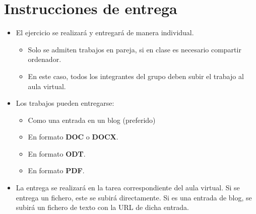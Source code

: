 \section{Instrucciones de entrega}
\begin{itemize}
\item El ejercicio se realizará y entregará de manera individual.
  \begin{itemize}
  \item Solo se admiten trabajos en pareja, si en clase es necesario compartir ordenador.
  \item En este caso, todos los integrantes del grupo deben subir el trabajo al aula virtual.

  \end{itemize}
\item Los trabajos pueden entregarse:
  \begin{itemize}
  \item Como una entrada en un blog (preferido)  
  \item En formato \textbf{DOC} o \textbf{DOCX}.
  \item En formato \textbf{ODT}.
  \item En formato \textbf{PDF}. 

  \end{itemize}

  
\item La entrega se realizará en la tarea correspondiente del aula virtual. Si se entrega un fichero, este se subirá directamente. Si es una entrada de blog, se subirá un fichero de texto con la URL de dicha entrada.
\end{itemize}  


